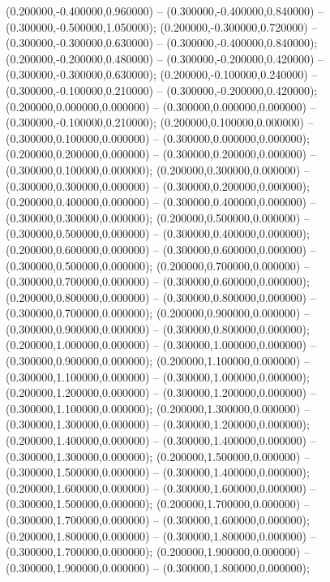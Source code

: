  (0.200000,-0.400000,0.960000) -- (0.300000,-0.400000,0.840000) -- (0.300000,-0.500000,1.050000);
 (0.200000,-0.300000,0.720000) -- (0.300000,-0.300000,0.630000) -- (0.300000,-0.400000,0.840000);
 (0.200000,-0.200000,0.480000) -- (0.300000,-0.200000,0.420000) -- (0.300000,-0.300000,0.630000);
 (0.200000,-0.100000,0.240000) -- (0.300000,-0.100000,0.210000) -- (0.300000,-0.200000,0.420000);
 (0.200000,0.000000,0.000000) -- (0.300000,0.000000,0.000000) -- (0.300000,-0.100000,0.210000);
 (0.200000,0.100000,0.000000) -- (0.300000,0.100000,0.000000) -- (0.300000,0.000000,0.000000);
 (0.200000,0.200000,0.000000) -- (0.300000,0.200000,0.000000) -- (0.300000,0.100000,0.000000);
 (0.200000,0.300000,0.000000) -- (0.300000,0.300000,0.000000) -- (0.300000,0.200000,0.000000);
 (0.200000,0.400000,0.000000) -- (0.300000,0.400000,0.000000) -- (0.300000,0.300000,0.000000);
 (0.200000,0.500000,0.000000) -- (0.300000,0.500000,0.000000) -- (0.300000,0.400000,0.000000);
 (0.200000,0.600000,0.000000) -- (0.300000,0.600000,0.000000) -- (0.300000,0.500000,0.000000);
 (0.200000,0.700000,0.000000) -- (0.300000,0.700000,0.000000) -- (0.300000,0.600000,0.000000);
 (0.200000,0.800000,0.000000) -- (0.300000,0.800000,0.000000) -- (0.300000,0.700000,0.000000);
 (0.200000,0.900000,0.000000) -- (0.300000,0.900000,0.000000) -- (0.300000,0.800000,0.000000);
 (0.200000,1.000000,0.000000) -- (0.300000,1.000000,0.000000) -- (0.300000,0.900000,0.000000);
 (0.200000,1.100000,0.000000) -- (0.300000,1.100000,0.000000) -- (0.300000,1.000000,0.000000);
 (0.200000,1.200000,0.000000) -- (0.300000,1.200000,0.000000) -- (0.300000,1.100000,0.000000);
 (0.200000,1.300000,0.000000) -- (0.300000,1.300000,0.000000) -- (0.300000,1.200000,0.000000);
 (0.200000,1.400000,0.000000) -- (0.300000,1.400000,0.000000) -- (0.300000,1.300000,0.000000);
 (0.200000,1.500000,0.000000) -- (0.300000,1.500000,0.000000) -- (0.300000,1.400000,0.000000);
 (0.200000,1.600000,0.000000) -- (0.300000,1.600000,0.000000) -- (0.300000,1.500000,0.000000);
 (0.200000,1.700000,0.000000) -- (0.300000,1.700000,0.000000) -- (0.300000,1.600000,0.000000);
 (0.200000,1.800000,0.000000) -- (0.300000,1.800000,0.000000) -- (0.300000,1.700000,0.000000);
 (0.200000,1.900000,0.000000) -- (0.300000,1.900000,0.000000) -- (0.300000,1.800000,0.000000);
